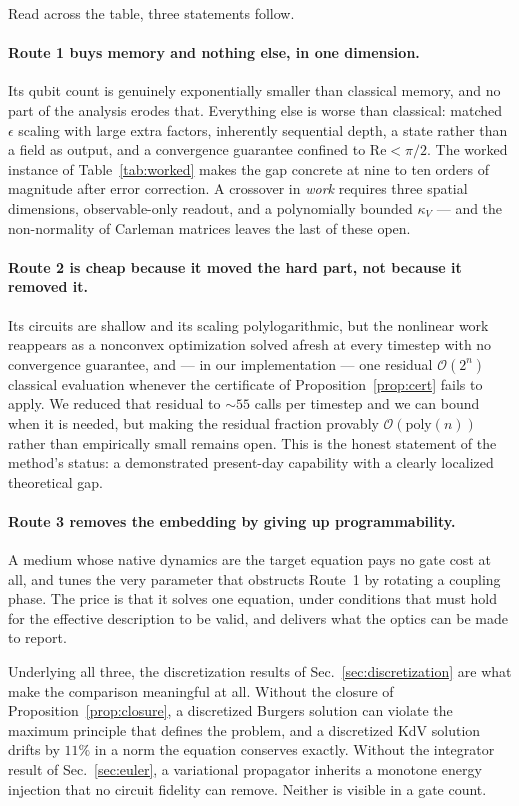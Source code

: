 \documentclass[aps,prx,twocolumn,notitlepage,superscriptaddress,floatfix,10pt]{revtex4-2}
\newcommand{\Rey}{\mathrm{Re}}
\newcommand{\Oh}{\mathcal{O}}
\begin{document}
Read across the table, three statements follow.

\paragraph{Route 1 buys memory and nothing else, in one dimension.} Its qubit count is genuinely
exponentially smaller than classical memory, and no part of the analysis erodes that. Everything
else is worse than classical: matched $\epsilon$ scaling with large extra factors, inherently
sequential depth, a state rather than a field as output, and a convergence guarantee confined to
$\Rey<\pi/2$. The worked instance of Table~\ref{tab:worked} makes the gap concrete at nine to ten
orders of magnitude after error correction. A crossover in \emph{work} requires three spatial
dimensions, observable-only readout, and a polynomially bounded $\kappa_V$ --- and the non-normality of
Carleman matrices leaves the last of these open.

\paragraph{Route 2 is cheap because it moved the hard part, not because it removed it.} Its circuits
are shallow and its scaling polylogarithmic, but the nonlinear work reappears as a nonconvex
optimization solved afresh at every timestep with no convergence guarantee, and --- in our
implementation --- one residual $\Oh(2^n)$ classical evaluation whenever the certificate of
Proposition~\ref{prop:cert} fails to apply. We reduced that residual to $\sim55$ calls per timestep
and we can bound when it is needed, but making the residual fraction provably $\Oh(\mathrm{poly}(n))$
rather than empirically small remains open. This is the honest statement of the method's status: a
demonstrated present-day capability with a clearly localized theoretical gap.

\paragraph{Route 3 removes the embedding by giving up programmability.} A medium whose native
dynamics are the target equation pays no gate cost at all, and tunes the very parameter that
obstructs Route~1 by rotating a coupling phase. The price is that it solves one equation, under
conditions that must hold for the effective description to be valid, and delivers what the optics can
be made to report.

Underlying all three, the discretization results of Sec.~\ref{sec:discretization} are what make the
comparison meaningful at all. Without the closure of Proposition~\ref{prop:closure}, a discretized
Burgers solution can violate the maximum principle that defines the problem, and a discretized KdV
solution drifts by $11\%$ in a norm the equation conserves exactly. Without the integrator result of
Sec.~\ref{sec:euler}, a variational propagator inherits a monotone energy injection that no circuit
fidelity can remove. Neither is visible in a gate count.
\end{document}
